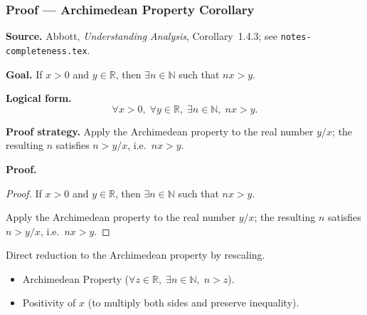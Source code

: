 
\clearpage
{}
\hypertarget{proof-RA-ABB-C-archimedean-corollary}{}

\subsubsection[Archimedean Property Corollary]{Proof --- Archimedean Property Corollary}

\bigskip

\noindent
\textbf{Source.}
Abbott, \emph{Understanding Analysis}, Corollary~1.4.3; see \texttt{notes-completeness.tex}.

\vspace{0.75em}

\noindent
\textbf{Goal.}
If $x > 0$ and $y \in \mathbb{R}$, then $\exists n \in \mathbb{N}$ such that $nx > y$.

\vspace{0.75em}

\noindent
\textbf{Logical form.}
\[
  \forall x > 0,\; \forall y \in \mathbb{R},\; \exists n \in \mathbb{N},\; nx > y.
\]

\vspace{0.75em}

\noindent
\textbf{Proof strategy.}
Apply the Archimedean property to the real number $y/x$; the resulting $n$ satisfies $n > y/x$, i.e.\ $nx > y$.

\vspace{0.75em}

\noindent
\textbf{Proof.}
\begin{proof}
\Claim If $x > 0$ and $y \in \mathbb{R}$, then $\exists n \in \mathbb{N}$ such that $nx > y$.

\Given 

\Goal 

\Strategy Apply the Archimedean property to the real number $y/x$; the resulting $n$ satisfies $n > y/x$, i.e.\ $nx > y$.

\medskip


\end{proof}

\begin{remark*}
Direct reduction to the Archimedean property by rescaling.
\end{remark*}

\begin{remark*}[Dependencies]
\begin{itemize}
  \item Archimedean Property ($\forall z \in \mathbb{R},\; \exists n \in \mathbb{N},\; n > z$).
  \item Positivity of $x$ (to multiply both sides and preserve inequality).
\end{itemize}
\end{remark*}
